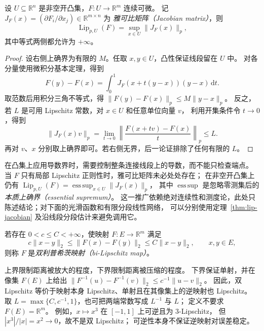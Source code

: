 \documentclass[UTF8,12pt,a4paper,fontset=fandol]{ctexart}
\begin{document}
\begin{theorem}\label{thm:lip-jacobian}
设 $U\subseteq\mathbb R^n$ 是非空开凸集，$F:U\to\mathbb R^m$ 连续可微。
记 $J_F(x)=(\partial F_i/\partial x_j)\in\mathbb R^{m\times n}$ 为
\emph{雅可比矩阵（Jacobian matrix）}，则
\begin{equation}\label{eq:lip-jacobian}
  \operatorname{Lip}_{p,U}(F)=\sup_{x\in U}\|J_F(x)\|_p,
\end{equation}
其中等式两侧都允许为 $+\infty$。
\end{theorem}
\begin{proof}
设右侧上确界为有限的 $M$。任取 $x,y\in U$，凸性保证线段留在 $U$ 中。
对各分量使用微积分基本定理，得到
\[
  F(y)-F(x)=\int_0^1J_F(x+t(y-x))(y-x)\,\mathrm dt.
\]
取范数后用积分三角不等式，得 $\|F(y)-F(x)\|_p\le M\|y-x\|_p$。
反之，若 $L$ 是可用 Lipschitz 常数，对 $x\in U$ 和任意单位向量 $v$，
利用开集条件令 $t\to0$，得到
\[
  \|J_F(x)v\|_p
  =\lim_{t\to0}\left\|\frac{F(x+tv)-F(x)}t\right\|_p\le L.
\]
再对 $v$、$x$ 分别取上确界即可。若右侧无界，后一论证排除了任何有限的 $L$。
\end{proof}

在凸集上应用导数界时，需要控制整条连接线段上的导数，而不能只检查端点。
当 $F$ 只有局部 Lipschitz 正则性时，雅可比矩阵未必处处存在；
在非空开凸集上仍有
$\operatorname{Lip}_{p,U}(F)=\operatorname*{ess\,sup}_{x\in U}\|J_F(x)\|_p$，
其中 $\operatorname*{ess\,sup}$ 是忽略零测集后的\emph{本质上确界（essential supremum）}。
这一推广依赖绝对连续性和测度论，此处只陈述结论；对下面的光滑函数和有限分段线性网络，
可以分别使用定理~\ref{thm:lip-jacobian} 及沿线段分段估计来避免调用它。

\begin{definition}\label{def:lip-bilipschitz}
若存在 $0<c\le C<+\infty$，使映射 $F:E\to\mathbb R^m$ 满足
\begin{equation}\label{eq:lip-bilipschitz}
  c\|x-y\|_2\le\|F(x)-F(y)\|_2\le C\|x-y\|_2,\qquad x,y\in E,
\end{equation}
则称 $F$ 是\emph{双利普希茨映射（bi-Lipschitz map）}。
\end{definition}

上界限制距离被放大的程度，下界限制距离被压缩的程度。
下界保证单射，并在像集 $F(E)$ 上给出
$\|F^{-1}(u)-F^{-1}(v)\|_2\le c^{-1}\|u-v\|_2$。
因此，双 Lipschitz 等价于映射本身 Lipschitz、单射且在其像集上的逆映射也 Lipschitz。
取 $L=\max\{C,c^{-1},1\}$，也可把两端常数写成 $L^{-1}$ 与 $L$；
定义不要求 $F(E)=\mathbb R^m$。
例如，$x\mapsto x^3$ 在 $[-1,1]$ 上可逆且为 $3$-Lipschitz，
但 $|x^3|/|x|=x^2\to0$，故不是双 Lipschitz；
可逆性本身不保证逆映射对误差稳定。
\end{document}
